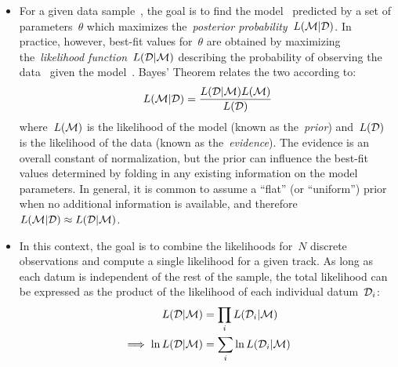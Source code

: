 \documentclass[ms.tex]{subfiles}
\begin{document}
\begin{itemize}
\begin{itemize}
	\end{itemize}

	\item For a given data sample~, the goal is to find the
	model~ predicted by a set of parameters~$\theta$ which maximizes
	the~\textit{posterior probability}~$L(\mathcal{M} | \mathcal{D})$.
	In practice, however, best-fit values for~$\theta$ are obtained by
	maximizing the~\textit{likelihood function}~$L(\mathcal{D} | \mathcal{M})$
	describing the probability of observing the data~ given the
	model~.
	Bayes' Theorem relates the two according to:
	\begin{equation}
	\label{eq:bayes_theorem}
	L(\mathcal{M} | \mathcal{D}) = \frac{
		L(\mathcal{D} | \mathcal{M}) L(\mathcal{M})
	}{
		L(\mathcal{D})
	}
	\end{equation}
	where~$L(\mathcal{M})$ is the likelihood of the model (known as
	the~\textit{prior}) and~$L(\mathcal{D})$ is the likelihood of the data
	(known as the~\textit{evidence}).
	The evidence is an overall constant of normalization, but the prior can
	influence the best-fit values determined by folding in any existing
	information on the model parameters.
	In general, it is common to assume a ``flat'' (or ``uniform'') prior when
	no additional information is available, and therefore
	$L(\mathcal{M} | \mathcal{D}) \approx L(\mathcal{D} | \mathcal{M})$.

	\item In this context, the goal is to combine the likelihoods for~$N$
	discrete observations and compute a single likelihood for a given track.
	As long as each datum is independent of the rest of the sample, the total
	likelihood can be expressed as the product of the likelihood of each
	individual datum~$\mathcal{D}_i$:
	\begin{subequations}\begin{align}
	L(\mathcal{D} | \mathcal{M}) &= \prod_i L(\mathcal{D}_i | \mathcal{M})
	\\
	\implies \ln L(\mathcal{D} | \mathcal{M}) &= \sum_i \ln L(\mathcal{D}_i |
	\mathcal{M})
	\label{eq:l_d_m}
	\end{align}\end{subequations}


\end{itemize}
\end{document}
